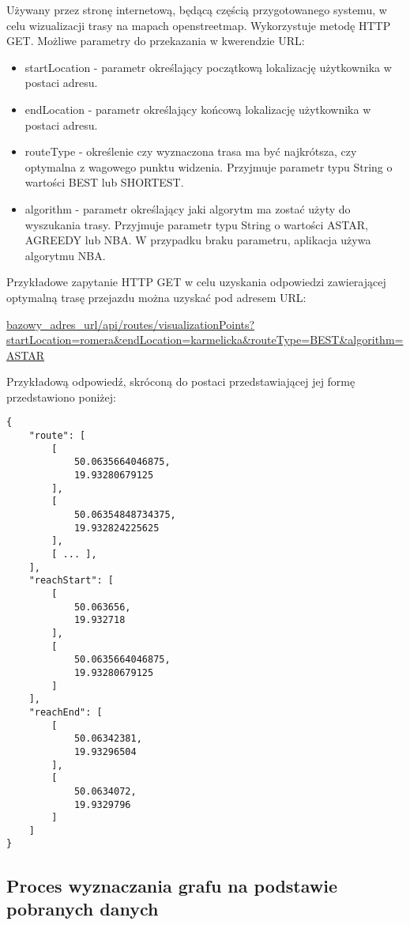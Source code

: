 \begin{enumerate}
Używany przez stronę internetową, będącą częścią przygotowanego systemu, w celu wizualizacji trasy na mapach openstreetmap. Wykorzystuje metodę HTTP GET. Możliwe parametry do przekazania w kwerendzie URL:

\begin{itemize}
\item startLocation - parametr określający początkową lokalizację użytkownika w postaci adresu.
\item endLocation - parametr określający końcową lokalizację użytkownika w postaci adresu.
\item routeType - określenie czy wyznaczona trasa ma być najkrótsza, czy optymalna z wagowego punktu widzenia. Przyjmuje parametr typu String o wartości BEST lub SHORTEST.
\item algorithm - parametr określający jaki algorytm ma zostać użyty do wyszukania trasy. Przyjmuje parametr typu String o wartości ASTAR, AGREEDY lub NBA. W przypadku braku parametru, aplikacja używa algorytmu NBA.
\end{itemize}

Przykładowe zapytanie HTTP GET w celu uzyskania odpowiedzi zawierającej optymalną trasę przejazdu można uzyskać pod adresem URL:

\url{bazowy_adres_url/api/routes/visualizationPoints?startLocation=romera&endLocation=karmelicka&routeType=BEST&algorithm=ASTAR}

Przykładową odpowiedź, skróconą do postaci przedstawiającej jej formę przedstawiono poniżej:

\begin{lstlisting}
{
    "route": [
        [
            50.0635664046875,
            19.93280679125
        ],
        [
            50.06354848734375,
            19.932824225625
        ],
        [ ... ],
    ],
    "reachStart": [
        [
            50.063656,
            19.932718
        ],
        [
            50.0635664046875,
            19.93280679125
        ]
    ],
    "reachEnd": [
        [
            50.06342381,
            19.93296504
        ],
        [
            50.0634072,
            19.9329796
        ]
    ]
}
\end{lstlisting}

\end{enumerate}

\subsection{Proces wyznaczania grafu na podstawie pobranych danych}

